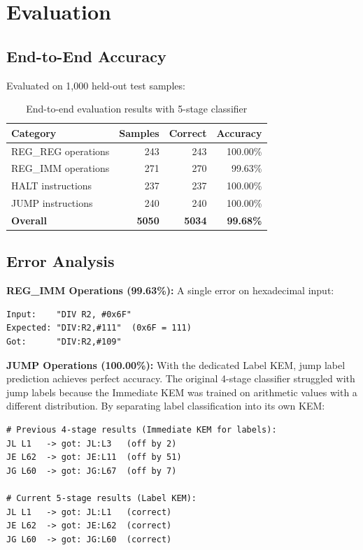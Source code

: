 \documentclass[11pt]{article}
\begin{document}
\section{Evaluation}

\subsection{End-to-End Accuracy}

Evaluated on 1,000 held-out test samples:

\begin{table}[h]
\centering
\begin{tabular}{lrrr}
\toprule
\textbf{Category} & \textbf{Samples} & \textbf{Correct} & \textbf{Accuracy} \\
\midrule
REG\_REG operations & 243 & 243 & 100.00\% \\
REG\_IMM operations & 271 & 270 & 99.63\% \\
HALT instructions & 237 & 237 & 100.00\% \\
JUMP instructions & 240 & 240 & 100.00\% \\
\midrule
\textbf{Overall} & \textbf{5050} & \textbf{5034} & \textbf{99.68\%} \\
\bottomrule
\end{tabular}
\caption{End-to-end evaluation results with 5-stage classifier}
\end{table}

\subsection{Error Analysis}

\textbf{REG\_IMM Operations (99.63\%):} A single error on hexadecimal input:
\begin{lstlisting}
Input:    "DIV R2, #0x6F"
Expected: "DIV:R2,#111"  (0x6F = 111)
Got:      "DIV:R2,#109"
\end{lstlisting}

\textbf{JUMP Operations (100.00\%):} With the dedicated Label KEM, jump label prediction achieves perfect accuracy. The original 4-stage classifier struggled with jump labels because the Immediate KEM was trained on arithmetic values with a different distribution. By separating label classification into its own KEM:
\begin{lstlisting}
# Previous 4-stage results (Immediate KEM for labels):
JL L1   -> got: JL:L3   (off by 2)
JE L62  -> got: JE:L11  (off by 51)
JG L60  -> got: JG:L67  (off by 7)

# Current 5-stage results (Label KEM):
JL L1   -> got: JL:L1   (correct)
JE L62  -> got: JE:L62  (correct)
JG L60  -> got: JG:L60  (correct)
\end{lstlisting}
\end{document}

